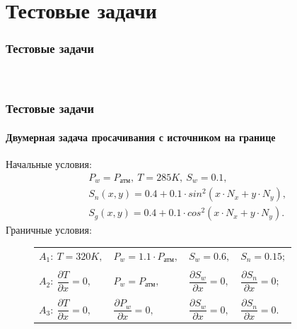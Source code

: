 \section{Тестовые задачи}

\begin{frame}
\begin{center}
\frametitle{Тестовые задачи}
\framesubtitle{\ }
\end{center}
\end{frame}

\begin{frame}
\frametitle{Тестовые задачи}
\framesubtitle{Двумерная задача просачивания с источником на границе}
\begin{center}
Начальные условия: 
\begin{equation*}
  \begin{aligned}
    &P_w=P_\text{атм},\ T=285K,\ S_w=0.1,\\
    &S_n(x, y)=0.4 + 0.1 \cdot sin^2(x \cdot N_x + y \cdot N_y),\\
    &S_g(x, y)=0.4 + 0.1 \cdot cos^2(x \cdot N_x + y \cdot N_y).
   \end{aligned}
\end{equation*}
Граничные условия:
\begin{figure}
\begin{minipage}[h]{0.24\textwidth}
\end{minipage}
\hfill
\begin{minipage}[h]{0.75\textwidth}
  \begin{tabular}{ l l l l }
    $A_1:\ T=320K,$ & $P_w=1.1\cdot P_{\text{атм}},$ & $S_w=0.6,$ & $S_n=0.15;$\\
      & & & \\
    $A_2:\ \dfrac{\partial{T}}{\partial{x}}=0,$ & ${P_w}=P_{\text{атм}},$ & $\dfrac{\partial{S_w}}{\partial{x}}=0,$ & $\dfrac{\partial{S_n}}{\partial{x}}=0;$\\
      & & & \\
    $A_3:\ \dfrac{\partial{T}}{\partial{x}}=0,$ & $\dfrac{\partial{P_w}}{\partial{x}}=0,$ & $\dfrac{\partial{S_w}}{\partial{x}}=0,$ & $\dfrac{\partial{S_n}}{\partial{x}}=0.$
  \end{tabular}
\end{minipage}
\end{figure}
\end{center}
\end{frame}

